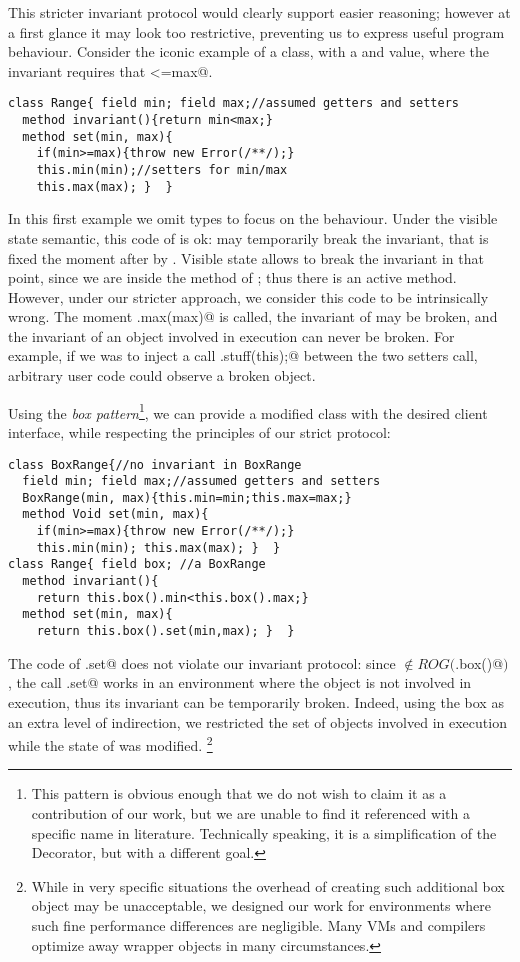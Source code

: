 This stricter invariant protocol would clearly support easier reasoning; however 
at a first glance it may look too restrictive, preventing us to express useful program behaviour.
Consider the iconic example of a \Q@Range@ class, with a \Q@min@ and \Q@max@
value, where the invariant requires that \Q@min<=max@.
\begin{lstlisting}
class Range{ field min; field max;//assumed getters and setters
  method invariant(){return min<max;}
  method set(min, max){
    if(min>=max){throw new Error(/**/);}
    this.min(min);//setters for min/max
    this.max(max); }  }
\end{lstlisting}
In this first example we omit types to focus on the behaviour.
Under the visible state semantic, this code of \Q@set@ is ok:
\Q@min@ may temporarily break the invariant, that is fixed the moment
after by \Q@max@. Visible state allows to break the invariant in that point, since
we are inside the method \Q@set@ of \Q@Range@; thus there is an active method.
However, under our stricter approach, we consider this code to be intrinsically wrong. The moment
\Q@this.max(max)@ is called, the invariant of \Q@this@ may be broken, and
the invariant of an object involved in execution can never be broken. For example, if we was to inject a call
\Q@Do.stuff(this);@ between the two setters call,
arbitrary user code could observe a broken object.

Using the \emph{box pattern}\footnote{
This pattern is obvious enough that we do not wish to claim it as a contribution of our work,
but we are unable to find it referenced with a specific name in literature. Technically speaking, it is a simplification of the Decorator, but with a different goal.}, we can provide a modified
\Q@Range@ class with the desired client interface, while respecting the principles of our strict protocol:
\begin{lstlisting}
class BoxRange{//no invariant in BoxRange
  field min; field max;//assumed getters and setters
  BoxRange(min, max){this.min=min;this.max=max;}
  method Void set(min, max){
    if(min>=max){throw new Error(/**/);}
    this.min(min); this.max(max); }  }
class Range{ field box; //a BoxRange
  method invariant(){
    return this.box().min<this.box().max;}
  method set(min, max){
    return this.box().set(min,max); }  }
\end{lstlisting}
The code of \Q@Range.set@ does not violate our invariant protocol:
  since \Q@this@ $\notin \mathit{ROG}($\Q@this.box()@$)$, the call
\Q@BoxRange.set@ works in an environment where the \Q@Range@ object is
not involved in execution, thus its invariant can be temporarily broken.
Indeed, using the box as an extra level of indirection, we restricted the set of objects involved in execution while the state of \Q@Range@ was modified.
\footnote{While in very specific situations the overhead of creating such additional box object may be unacceptable, 
we designed our work for environments where such fine performance differences are negligible.
Many VMs and compilers optimize away wrapper objects in many circumstances.\cite{help}}

